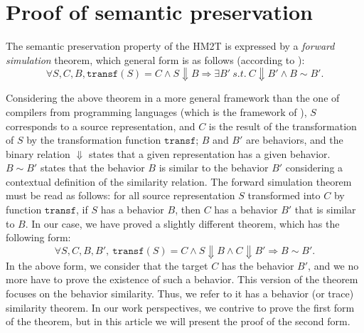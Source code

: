 \section{Proof of semantic preservation}
\label{sec:proof}

The semantic preservation property of the HM2T is expressed by a
\textit{forward simulation} theorem, which general form is as follows
(according to \cite{Leroy2009}):
\begin{equation*}
  \forall{}S,C,B,\mathtt{transf}(S)=C\land{}S\Downarrow{}B\Rightarrow{}\exists{}B'~s.t.~C\Downarrow{}B'\land{}B\sim{}B'.
\end{equation*}

Considering the above theorem in a more general framework than the one
of compilers from programming languages (which is the framework of
\cite{Leroy2009}), $S$ corresponds to a source representation, and $C$
is the result of the transformation of $S$ by the transformation
function $\mathtt{transf}$; $B$ and $B'$ are behaviors, and the binary
relation $\Downarrow$ states that a given representation has a given
behavior. $B\sim{}B'$ states that the behavior $B$ is similar to the
behavior $B'$ considering a contextual definition of the similarity
relation. The forward simulation theorem must be read as follows: for
all source representation $S$ transformed into $C$ by function
$\mathtt{transf}$, if $S$ has a behavior $B$, then $C$ has a behavior
$B'$ that is similar to $B$. In our case, we have proved a slightly
different theorem, which has the following form:
\begin{equation*}
  \forall{}S,C,B,B',~\mathtt{transf}(S)=C\land{}S\Downarrow{}B\land{}C\Downarrow{}B'\Rightarrow{}B\sim{}B'.
\end{equation*}
In the above form, we consider that the target $C$ has the behavior
$B'$, and we no more have to prove the existence of such a behavior.
This version of the theorem focuses on the behavior similarity. Thus,
we refer to it has a behavior (or trace) similarity theorem. In our
work perspectives, we contrive to prove the first form of the theorem,
but in this article we will present the proof of the second form.

